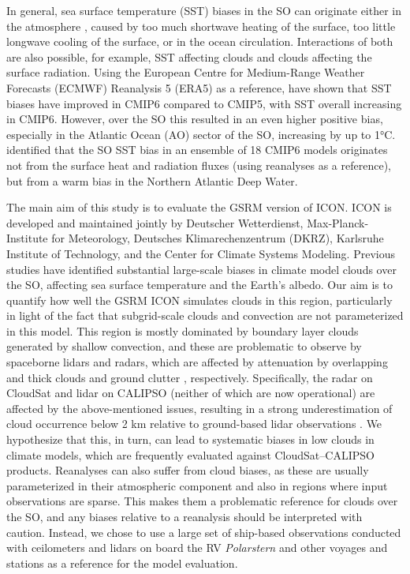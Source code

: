 \documentclass[draft]{agujournal2019}
\begin{document}
In general, sea surface temperature (SST) biases in the SO can originate either in the atmosphere \cite{hyder2018}, caused by too much shortwave heating of the surface, too little longwave cooling of the surface, or in the ocean circulation. Interactions of both are also possible, for example, SST affecting clouds and clouds affecting the surface radiation. Using the European Centre for Medium-Range Weather Forecasts (ECMWF) Reanalysis 5 (ERA5) as a reference,  have shown that SST biases have improved in CMIP6 compared to CMIP5, with SST overall increasing in CMIP6. However, over the SO this resulted in an even higher positive bias, especially in the Atlantic Ocean (AO) sector of the SO, increasing by up to 1°C.  identified that the SO SST bias in an ensemble of 18 CMIP6 models originates not from the surface heat and radiation fluxes (using reanalyses as a reference), but from a warm bias in the Northern Atlantic Deep Water.

The main aim of this study is to evaluate the GSRM version of ICON. ICON is developed and maintained jointly by Deutscher Wetterdienst, Max-Planck-Institute for Meteorology, Deutsches Klimarechenzentrum (DKRZ), Karlsruhe Institute of Technology, and the Center for Climate Systems Modeling. Previous studies have identified substantial large-scale biases in climate model clouds over the SO, affecting sea surface temperature and the Earth’s albedo. Our aim is to quantify how well the GSRM ICON simulates clouds in this region, particularly in light of the fact that subgrid-scale clouds and convection are not parameterized in this model. This region is mostly dominated by boundary layer clouds generated by shallow convection, and these are problematic to observe by spaceborne lidars and radars, which are affected by attenuation by overlapping and thick clouds \cite{mace2009,medeiros2010} and ground clutter \cite{marchand2008}, respectively. Specifically, the radar on CloudSat and lidar on CALIPSO (neither of which are now operational) are affected by the above-mentioned issues, resulting in a strong underestimation of cloud occurrence below 2 km relative to ground-based lidar observations \cite{mcerlich2021}. We hypothesize that this, in turn, can lead to systematic biases in low clouds in climate models, which are frequently evaluated against CloudSat--CALIPSO products. Reanalyses can also suffer from cloud biases, as these are usually parameterized in their atmospheric component and also in regions where input observations are sparse. This makes them a problematic reference for clouds over the SO, and any biases relative to a reanalysis should be interpreted with caution. Instead, we chose to use a large set of ship-based observations conducted with ceilometers and lidars on board the RV \emph{Polarstern} and other voyages and stations as a reference for the model evaluation.
\end{document}
